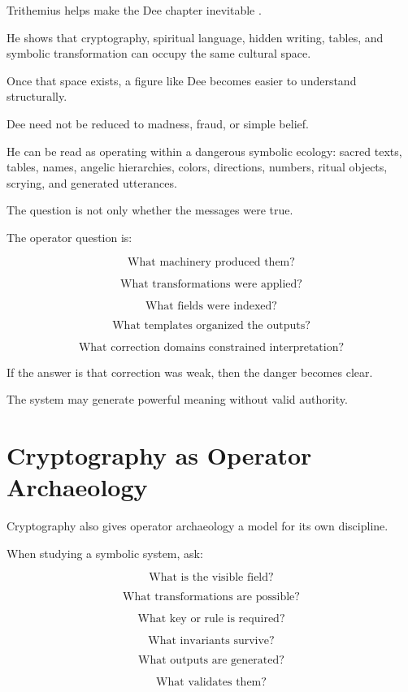 \documentclass[11pt]{book}
\begin{document}
Trithemius helps make the Dee chapter inevitable \cite{Trithemius1999Steganographia,Yates1964GiordanoBruno,DeeCasaubon1659TrueFaithfulRelation}.

He shows that cryptography, spiritual language, hidden writing, tables, and symbolic transformation can occupy the same cultural space.

Once that space exists, a figure like Dee becomes easier to understand structurally.

Dee need not be reduced to madness, fraud, or simple belief.

He can be read as operating within a dangerous symbolic ecology: sacred texts, tables, names, angelic hierarchies, colors, directions, numbers, ritual objects, scrying, and generated utterances.

The question is not only whether the messages were true.

The operator question is:

\[
\text{What machinery produced them?}
\]

\[
\text{What transformations were applied?}
\]

\[
\text{What fields were indexed?}
\]

\[
\text{What templates organized the outputs?}
\]

\[
\text{What correction domains constrained interpretation?}
\]

If the answer is that correction was weak, then the danger becomes clear.

The system may generate powerful meaning without valid authority.

\section{Cryptography as Operator Archaeology}

Cryptography also gives operator archaeology a model for its own discipline.

When studying a symbolic system, ask:

\[
\text{What is the visible field?}
\]

\[
\text{What transformations are possible?}
\]

\[
\text{What key or rule is required?}
\]

\[
\text{What invariants survive?}
\]

\[
\text{What outputs are generated?}
\]

\[
\text{What validates them?}
\]
\end{document}
